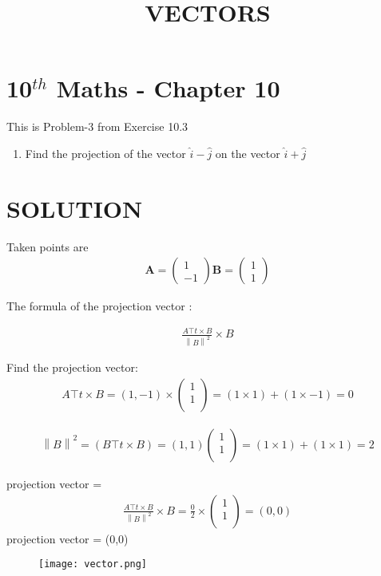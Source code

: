 \documentclass[12pt]{article}
\providecommand{\norm}[1]{\left\lVert#1\right\rVert}
\newcommand{\myvec}[1]{\ensuremath{\begin{pmatrix}#1\end{pmatrix}}}
\let\vec\mathbf
\begin{document}
\begin{center}
\title{\textbf{VECTORS}}
\date{\vspace{-5ex}} %
\maketitle
\end{center}

\setcounter{page}{1}

\section{10$^{th}$ Maths - Chapter 10}

This is Problem-3 from Exercise 10.3

\begin{enumerate}
\item Find the projection of the vector $\hat{i}-\hat{j}$ on the vector $\hat{i}+\hat{j}$  
\end{enumerate}
\section{SOLUTION}
Taken points are
\begin{align}
 \vec{A}=\myvec{1\\ -1}
 \vec{B}=\myvec{1\\ 1}
\end{align}

The formula of the projection vector :
 
\begin{align}
\frac{A\top t\times B}{\norm B^2}\times B
\end{align}

Find the projection vector:
\begin{align}
A\top t\times B = (1, -1)\times \left(\begin{matrix}
1\\
1\\
\end{matrix}\right)  = (1\times1)+(1\times-1)=0
\end{align}

\begin{align}
\norm B^2 = (B\top t\times B)=(1,1)\left(\begin{matrix}
1\\
1\\
\end{matrix}\right)= (1\times1)+(1\times1)=2
\end{align}

projection vector = 
\begin{align}
 \frac{A\top t\times B}{\norm B^2}\times B
   =\frac{0}{2}\times \left(\begin{matrix}
   1\\
   1\\
   \end{matrix}\right)
    =(0,0)
\end{align}
projection vector = (0,0)

\begin{figure}[h]
  \centering
  \texttt{[image: vector.png]}
\caption{}
\end{figure}
\end{document}

